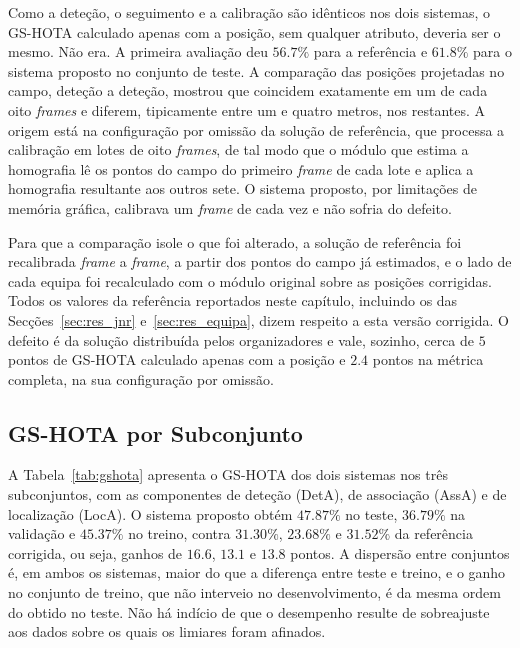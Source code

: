 Como a deteção, o seguimento e a calibração são idênticos nos dois sistemas, o GS-HOTA calculado
apenas com a posição, sem qualquer atributo, deveria ser o mesmo. Não era. A primeira avaliação
deu $56.7\%$ para a referência e $61.8\%$ para o sistema proposto no conjunto de teste. A
comparação das posições projetadas no campo, deteção a deteção, mostrou que coincidem exatamente
em um de cada oito \emph{frames} e diferem, tipicamente entre um e quatro metros, nos restantes. A
origem está na configuração por omissão da solução de referência, que processa a calibração em
lotes de oito \emph{frames}, de tal modo que o módulo que estima a homografia lê os pontos do campo do primeiro
\emph{frame} de cada lote e aplica a homografia resultante aos outros sete. O sistema proposto,
por limitações de memória gráfica, calibrava um \emph{frame} de cada vez e não sofria do defeito.

Para que a comparação isole o que foi alterado, a solução de referência foi recalibrada
\emph{frame} a \emph{frame}, a partir dos pontos do campo já estimados, e o lado de cada equipa foi
recalculado com o módulo original sobre as posições corrigidas. Todos os valores da referência
reportados neste capítulo, incluindo os das Secções~\ref{sec:res_jnr} e~\ref{sec:res_equipa}, dizem
respeito a esta versão corrigida. O defeito é da solução distribuída pelos organizadores e vale,
sozinho, cerca de $5$ pontos de GS-HOTA calculado apenas com a posição e
$2.4$ pontos na métrica completa, na sua configuração por omissão.

\subsection{GS-HOTA por Subconjunto}\label{sec:res_gshota}

A Tabela~\ref{tab:gshota} apresenta o GS-HOTA dos dois sistemas nos três subconjuntos, com as
componentes de deteção (DetA), de associação (AssA) e de localização (LocA). O sistema proposto
obtém $47.87\%$ no teste, $36.79\%$ na validação e $45.37\%$ no treino, contra
$31.30\%$, $23.68\%$ e $31.52\%$ da referência corrigida, ou seja, ganhos de
$16.6$, $13.1$ e $13.8$ pontos. A dispersão entre conjuntos é, em ambos os
sistemas, maior do que a diferença entre teste e treino, e o ganho no conjunto de treino, que não
interveio no desenvolvimento, é da mesma ordem do obtido no teste. Não há indício de que o
desempenho resulte de sobreajuste aos dados sobre os quais os limiares foram afinados.

